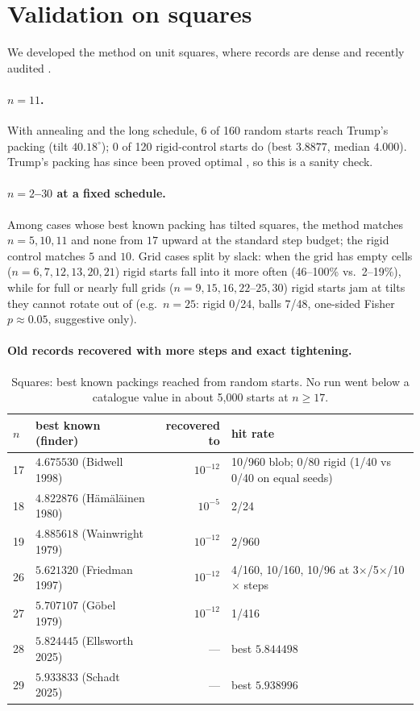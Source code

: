 \documentclass[11pt]{article}
\begin{document}
\section{Validation on squares}\label{sec:squares}
We developed the method on unit squares, where records are dense and recently audited \cite{squaresproject,friedmansurvey}.

\paragraph{$n=11$.} With annealing and the long schedule, 6 of 160 random starts reach Trump's packing (tilt $40.18^\circ$); 0 of 120 rigid-control starts do (best $3.8877$, median $4.000$). Trump's packing has since been proved optimal \cite{squaresproject}, so this is a sanity check.

\paragraph{$n=2$--$30$ at a fixed schedule.} Among cases whose best known packing has tilted squares, the method matches $n=5,10,11$ and none from $17$ upward at the standard step budget; the rigid control matches $5$ and $10$. Grid cases split by slack: when the grid has empty cells ($n=6,7,12,13,20,21$) rigid starts fall into it more often (46--100\% vs.\ 2--19\%), while for full or nearly full grids ($n=9,15,16,22$--$25,30$) rigid starts jam at tilts they cannot rotate out of (e.g.\ $n=25$: rigid 0/24, balls 7/48, one-sided Fisher $p\approx0.05$, suggestive only).

\paragraph{Old records recovered with more steps and exact tightening.}
\begin{table}[h]\centering\small
\begin{tabular}{llrl}\toprule
$n$ & best known (finder) & recovered to & hit rate\\\midrule
17 & $4.675530$ (Bidwell 1998) & $10^{-12}$ & 10/960 blob; 0/80 rigid (1/40 vs 0/40 on equal seeds) \\
18 & $4.822876$ (H\"am\"al\"ainen 1980) & $10^{-5}$ & 2/24 \\
19 & $4.885618$ (Wainwright 1979) & $10^{-12}$ & 2/960 \\
26 & $5.621320$ (Friedman 1997) & $10^{-12}$ & 4/160, 10/160, 10/96 at 3$\times$/5$\times$/10$\times$ steps\\
27 & $5.707107$ (G\"obel 1979) & $10^{-12}$ & 1/416 \\
28 & $5.824445$ (Ellsworth 2025) & --- & best $5.844498$ \\
29 & $5.933833$ (Schadt 2025) & --- & best $5.938996$ \\\bottomrule
\end{tabular}
\caption{Squares: best known packings reached from random starts. No run went below a catalogue value in about 5{,}000 starts at $n\ge17$.}\label{tab:squares}
\end{table}
\end{document}
